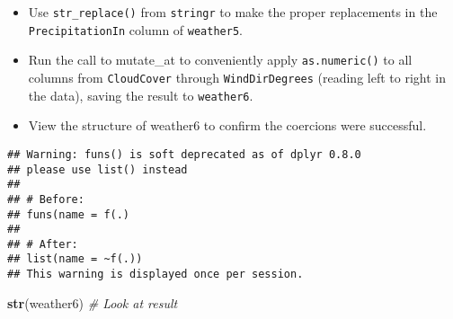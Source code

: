 \documentclass[]{article}
\newenvironment{Shaded}{\begin{snugshade}}{\end{snugshade}}
\newcommand{\KeywordTok}[1]{\textcolor[rgb]{0.13,0.29,0.53}{\textbf{#1}}}
\newcommand{\StringTok}[1]{\textcolor[rgb]{0.31,0.60,0.02}{#1}}
\newcommand{\CommentTok}[1]{\textcolor[rgb]{0.56,0.35,0.01}{\textit{#1}}}
\newcommand{\OperatorTok}[1]{\textcolor[rgb]{0.81,0.36,0.00}{\textbf{#1}}}
\newcommand{\NormalTok}[1]{#1}
\begin{document}
\begin{itemize}
\item
  Use \texttt{str\_replace()} from \texttt{stringr} to make the proper
  replacements in the \texttt{PrecipitationIn} column of
  \texttt{weather5}.
\item
  Run the call to mutate\_at to conveniently apply \texttt{as.numeric()}
  to all columns from \texttt{CloudCover} through
  \texttt{WindDirDegrees} (reading left to right in the data), saving
  the result to \texttt{weather6}.
\item
  View the structure of weather6 to confirm the coercions were
  successful.
\end{itemize}

\begin{Shaded}
\end{Shaded}

\begin{verbatim}
## Warning: funs() is soft deprecated as of dplyr 0.8.0
## please use list() instead
## 
## # Before:
## funs(name = f(.)
## 
## # After: 
## list(name = ~f(.))
## This warning is displayed once per session.
\end{verbatim}

\begin{Shaded}
\begin{Highlighting}[]
\KeywordTok{str}\NormalTok{(weather6) }\CommentTok{# Look at result}
\end{Highlighting}
\end{Shaded}
\end{document}
